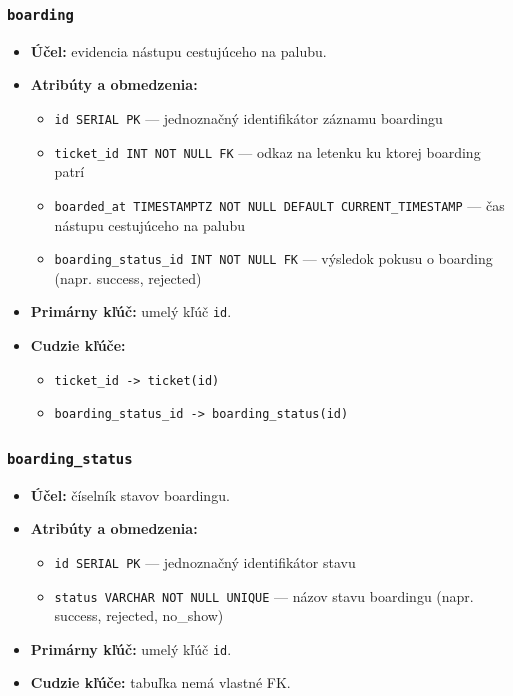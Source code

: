 \documentclass[11pt, a4paper]{article}
\begin{document}
\subsubsection*{\texttt{boarding}}
\begin{itemize}
    \item \textbf{Účel:} evidencia nástupu cestujúceho na palubu.
    \item \textbf{Atribúty a obmedzenia:}
    \begin{itemize}
        \item \texttt{id SERIAL PK} --- jednoznačný identifikátor záznamu boardingu
        \item \texttt{ticket\_id INT NOT NULL FK} --- odkaz na letenku ku ktorej boarding patrí
        \item \texttt{boarded\_at TIMESTAMPTZ NOT NULL DEFAULT CURRENT\_TIMESTAMP} --- čas nástupu cestujúceho na palubu
        \item \texttt{boarding\_status\_id INT NOT NULL FK} --- výsledok pokusu o boarding (napr. success, rejected)
    \end{itemize}
    \item \textbf{Primárny kľúč:} umelý kľúč \texttt{id}.
    \item \textbf{Cudzie kľúče:} 
    \begin{itemize}
        \item \texttt{ticket\_id -> ticket(id)}
        \item \texttt{boarding\_status\_id -> boarding\_status(id)}
    \end{itemize}
    
\end{itemize}

\subsubsection*{\texttt{boarding\_status}}
\begin{itemize}
    \item \textbf{Účel:} číselník stavov boardingu.
    \item \textbf{Atribúty a obmedzenia:}
    \begin{itemize}
        \item \texttt{id SERIAL PK} --- jednoznačný identifikátor stavu
        \item \texttt{status VARCHAR NOT NULL UNIQUE} --- názov stavu boardingu (napr. success, rejected, no\_show)
    \end{itemize}
    \item \textbf{Primárny kľúč:} umelý kľúč \texttt{id}.
    \item \textbf{Cudzie kľúče:} tabuľka nemá vlastné FK.
\end{itemize}
\end{document}

